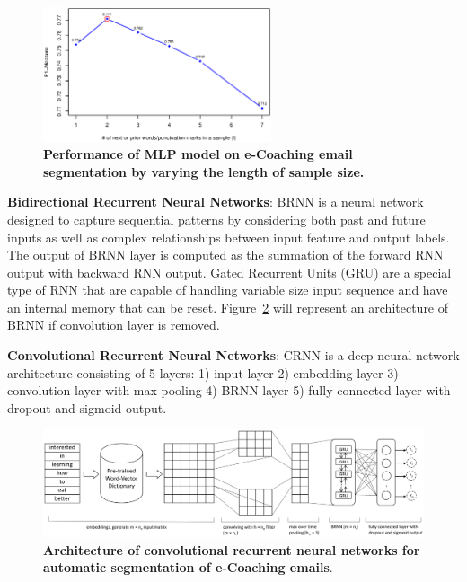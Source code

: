 \documentclass{amia}
\begin{document}
\begin{figure}[!htb]
    \centering
    \includegraphics[width=0.60\textwidth]{figures/length-mlp.eps}
    \caption{\textbf{Performance of MLP model on e-Coaching email segmentation by varying the length of sample size.}}
    \label{fig:length-mlp}
\end{figure}

\textbf{Bidirectional Recurrent Neural Networks}: BRNN is a neural network designed to capture sequential patterns by considering both past and future inputs as well as complex relationships between input feature and output labels. The output of BRNN layer is computed as the summation of the forward RNN output with backward RNN output. Gated Recurrent Units (GRU) \cite{chung2014empirical} are a special type of RNN that are capable of handling variable size input sequence and have an internal memory that can be reset. Figure~\ref{fig:crnn} will represent an architecture of BRNN if convolution layer is removed.  

\textbf{Convolutional Recurrent Neural Networks}: CRNN is a deep neural network architecture consisting of 5 layers: 1) input layer 2) embedding layer 3) convolution layer with max pooling 4) BRNN layer 5) fully connected layer with dropout and sigmoid output. 

\begin{figure}[!htb]
    \centering
    \includegraphics[width=1.0\textwidth]{figures/CRNN.eps}
    \caption{\textbf{Architecture of convolutional recurrent neural networks for automatic segmentation of e-Coaching emails}.}
    \label{fig:crnn}
\end{figure}
\end{document}
